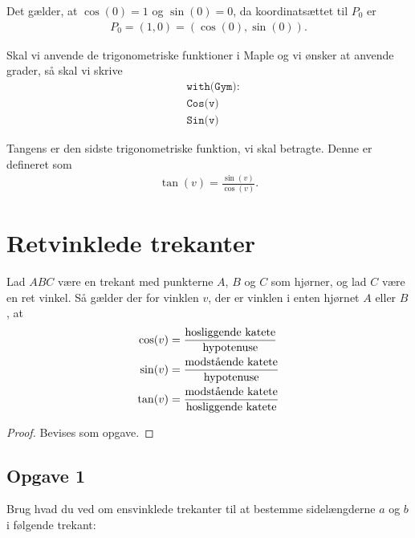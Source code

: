 \begin{exa}
Det gælder, at $\cos(0) = 1$ og $\sin(0)=0$, da koordinatsættet til $P_0$ er 
\begin{align*}
P_0 = (1,0) = (\cos(0),\sin(0)).
\end{align*}
\end{exa}

Skal vi anvende de trigonometriske funktioner i Maple og vi ønsker at anvende grader, så skal vi skrive
\begin{align*}
	&\texttt{with(Gym):} \\
	&\texttt{Cos(v)} \\	
	&\texttt{Sin(v)}
\end{align*}



Tangens er den sidste trigonometriske funktion, vi skal betragte. Denne er defineret som 
\begin{align*}
\tan(v) = \frac{\sin(v)}{\cos(v)}.
\end{align*}


\section*{Retvinklede trekanter}

\begin{setn}
	\label{setn:trigretvinkel}
Lad $ABC$ være en trekant med punkterne $A$,  $B$ og $C$ som hjørner, og lad $C$ være en ret vinkel. Så gælder der for vinklen $v$, der er vinklen i enten hjørnet $A$ eller $B$, at 
\begin{align*}
\cos(v) &= \frac{\textnormal{hosliggende katete}}{\textnormal{hypotenuse}}\\
\sin(v) &= \frac{\textnormal{modstående katete}}{\textnormal{hypotenuse}}\\
\tan(v) &= \frac{\textnormal{modstående katete}}{\textnormal{hosliggende katete}}
\end{align*}
\end{setn}
\begin{proof}
Bevises som opgave.
\end{proof}


\subsection*{Opgave 1}

Brug hvad du ved om ensvinklede trekanter til at bestemme sidelængderne $a$ og $b$ i følgende trekant:

